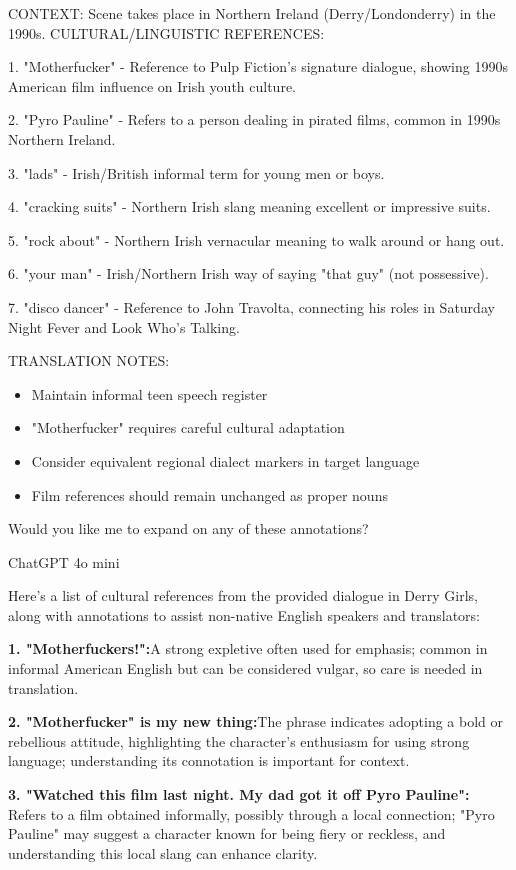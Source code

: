 \documentclass[output=paper]{langscibook}
\begin{document}
{CONTEXT: Scene takes place in Northern Ireland (Derry/Londonderry) in the 1990s. CULTURAL/LINGUISTIC REFERENCES:}

{1. "Motherfucker" - Reference to Pulp Fiction's signature dialogue, showing 1990s American film influence on Irish youth culture.}

{2. "Pyro Pauline" - Refers to a person dealing in pirated films, common in 1990s Northern Ireland.}

{3. "lads" - Irish/British informal term for young men or boys.}

{4. "cracking suits" - Northern Irish slang meaning excellent or impressive suits.}

{5. "rock about" - Northern Irish vernacular meaning to walk around or hang out.}

{6. "your man" - Irish/Northern Irish way of saying "that guy" (not possessive).}

{7. "disco dancer" - Reference to John Travolta, connecting his roles in Saturday Night Fever and Look Who's Talking.}

 {TRANSLATION NOTES:}

\begin{itemize}
\item  {Maintain informal teen speech register}
\item  {"Motherfucker" requires careful cultural adaptation}
\item  {Consider equivalent regional dialect markers in target language}
\item  {Film references should remain unchanged as proper nouns}
\end{itemize}

 {Would you like me to expand on any of these annotations?}

\ex ChatGPT 4o mini


{Here’s a list of cultural references from the provided dialogue in Derry Girls, along with annotations to assist non-native English speakers and translators:}

\textbf{{1. "Motherfuckers!":}}{A strong expletive often used for emphasis; common in informal American English but can be considered vulgar, so care is needed in translation.}

\textbf{{2. "Motherfucker" is my new thing:}}{The phrase indicates adopting a bold or rebellious attitude, highlighting the character's enthusiasm for using strong language; understanding its connotation is important for context.}

\textbf{{3. "Watched this film last night. My dad got it off Pyro Pauline":}}{ Refers to a film obtained informally, possibly through a local connection; "Pyro Pauline" may suggest a character known for being fiery or reckless, and understanding this local slang can enhance clarity.}
\end{document}
